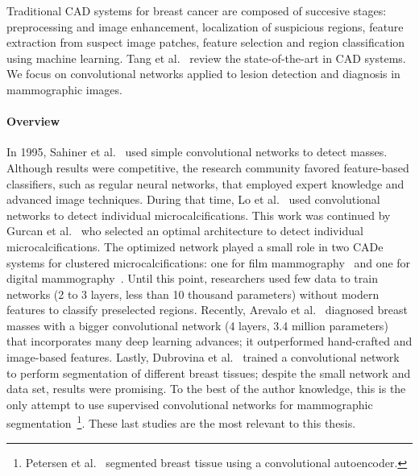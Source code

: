 Traditional CAD systems for breast cancer are composed of succesive stages: preprocessing and image enhancement, localization of suspicious regions, feature extraction from suspect image patches, feature selection and region classification using machine learning.
Tang et al.~\cite{Tang2009} review the state-of-the-art in CAD systems. We focus on convolutional networks applied to lesion detection and diagnosis in mammographic images.

\paragraph{Overview}
In 1995, Sahiner et al.~\cite{Sahiner1996} used simple convolutional networks to detect masses.
Although results were competitive, the research community favored feature-based classifiers, such as regular neural networks, that employed expert knowledge and advanced image techniques.
During that time, Lo et al.~\cite{Lo1995, Lo1998} used convolutional networks to detect individual microcalcifications.
This work was continued by Gurcan et al.~\cite{Gurcan2002} who selected an optimal architecture to detect individual microcalcifications. The optimized network played a small role in two CADe systems for clustered microcalcifications: one for film mammography~\cite{Gurcan2002} and one for digital mammography~\cite{Ge2006}.
Until this point, researchers used few data to train networks (2 to 3 layers, less than 10 thousand parameters) without modern features to classify preselected regions.
Recently, Arevalo et al.~\cite{Arevalo2016} diagnosed breast masses with a bigger convolutional network (4 layers, 3.4 million parameters) that incorporates many deep learning advances; it outperformed hand-crafted and image-based features.
Lastly, Dubrovina et al.~\cite{Dubrovina2015} trained a convolutional network to perform segmentation of different breast tissues; despite the small network and data set, results were promising.
To the best of the author knowledge, this is the only attempt to use supervised convolutional networks for mammographic segmentation~\footnote{Petersen et al.~\cite{Petersen2014} segmented breast tissue using a convolutional autoencoder.}.
These last studies are the most relevant to this thesis.

